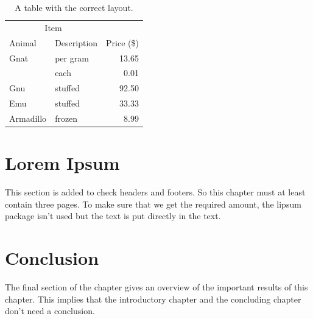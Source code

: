 \begin{table}
  \centering
  \begin{tabular}{@{}llr@{}} \toprule
    \multicolumn{2}{c}{Item} \\ \cmidrule(r){1-2}
    Animal    & Description & Price (\$)\\ \midrule
    Gnat      & per gram    & 13.65 \\
              & each        & 0.01 \\
    Gnu       & stuffed     & 92.50 \\
    Emu       & stuffed     & 33.33 \\
    Armadillo & frozen      & 8.99 \\ \bottomrule
  \end{tabular}
  \caption{A table with the correct layout.}
  \label{tab:ok}
\end{table}

\section{Lorem Ipsum}
This section is added to check headers and footers. So this chapter must at
least contain three pages. To make sure that we get the required amount,
the \textsf{lipsum} package isn't used but the text is put directly in the
text.


\section{Conclusion}
The final section of the chapter gives an overview of the important results
of this chapter. This implies that the introductory chapter and the
concluding chapter don't need a conclusion.



